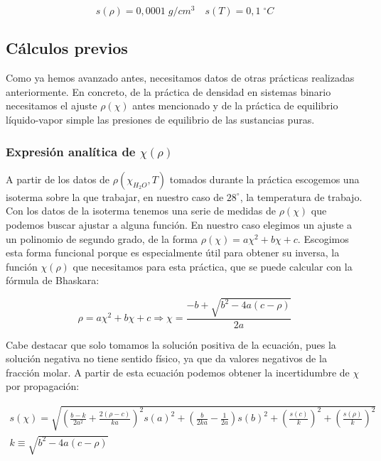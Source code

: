 \documentclass[a4paper,12pt,titlepage]{article}
\begin{document}
\begin{equation}
    s(\rho) = 0,0001 \;g/cm^{3} \quad s(T)=0,1 \; ^{\circ}C
\end{equation}

\subsection{Cálculos previos}

Como ya hemos avanzado antes, necesitamos datos de otras prácticas realizadas anteriormente. En concreto, de la práctica de densidad en sistemas binario necesitamos el ajuste $\rho(\chi)$ antes mencionado y de la práctica de equilibrio líquido-vapor simple las presiones de equilibrio de las sustancias puras.

\subsubsection{Expresión analítica de $\chi(\rho)$}

A partir de los datos de $\rho(\chi_{H_2O},T)$ tomados durante la práctica escogemos una isoterma sobre la que trabajar, en nuestro caso de $28^{\circ}$, la temperatura de trabajo. Con los datos de la isoterma tenemos una serie de medidas de $\rho(\chi)$ que podemos buscar ajustar a alguna función. En nuestro caso elegimos un ajuste a un polinomio de segundo grado, de la forma $\rho(\chi) = a\chi^2 + b\chi + c$. Escogimos esta forma funcional porque es especialmente útil para obtener su inversa, la función $\chi(\rho)$ que necesitamos para esta práctica, que se puede calcular con la fórmula de Bhaskara:

\begin{equation}
    \rho = a\chi^2 + b\chi + c \Rightarrow \chi = \frac{-b + \sqrt{b^2 - 4a(c-\rho)}}{2a}
    \label{chi_rho}
\end{equation}

Cabe destacar que solo tomamos la solución positiva de la ecuación, pues la solución negativa no tiene sentido físico, ya que da valores negativos de la fracción molar. A partir de esta ecuación podemos obtener la incertidumbre de $\chi$ por propagación:

\begin{equation}
    \begin{gathered}
        s(\chi) = \sqrt{ \left( \frac{b-k}{2a^2} + \frac{2(\rho - c)}{ka} \right)^2 s(a)^2 + \left(\frac{b}{2ka} - \frac{1}{2a} \right)s(b)^2 + \left( \frac{s(c)}{k} \right)^2 + \left( \frac{s(\rho)}{k} \right)^2} 
        \\
        k \equiv \sqrt{b^2 - 4a(c-\rho)}
    \end{gathered}
\end{equation}
\end{document}
